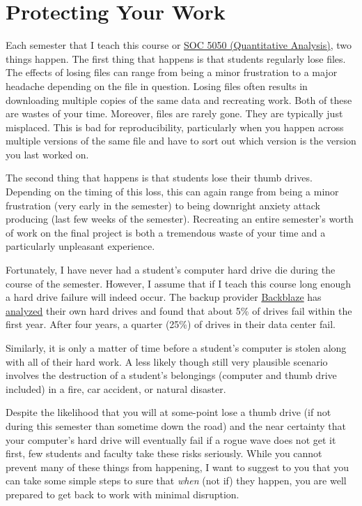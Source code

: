 \documentclass[]{book}
\begin{document}
\chapter{Protecting Your Work}\label{protecting-your-work}

Each semester that I teach this course or
\href{https://slu-soc5050.github.io}{SOC 5050 (Quantitative Analysis)},
two things happen. The first thing that happens is that students
regularly lose files. The effects of losing files can range from being a
minor frustration to a major headache depending on the file in question.
Losing files often results in downloading multiple copies of the same
data and recreating work. Both of these are wastes of your time.
Moreover, files are rarely gone. They are typically just misplaced. This
is bad for reproducibility, particularly when you happen across multiple
versions of the same file and have to sort out which version is the
version you last worked on.

The second thing that happens is that students lose their thumb drives.
Depending on the timing of this loss, this can again range from being a
minor frustration (very early in the semester) to being downright
anxiety attack producing (last few weeks of the semester). Recreating an
entire semester's worth of work on the final project is both a
tremendous waste of your time and a particularly unpleasant experience.

Fortunately, I have never had a student's computer hard drive die during
the course of the semester. However, I assume that if I teach this
course long enough a hard drive failure will indeed occur. The backup
provider \href{https://www.backblaze.com/}{Backblaze} has
\href{https://www.backblaze.com/blog/how-long-do-disk-drives-last/}{analyzed}
their own hard drives and found that about 5\% of drives fail within the
first year. After four years, a quarter (25\%) of drives in their data
center fail.

Similarly, it is only a matter of time before a student's computer is
stolen along with all of their hard work. A less likely though still
very plausible scenario involves the destruction of a student's
belongings (computer and thumb drive included) in a fire, car accident,
or natural disaster.

Despite the likelihood that you will at some-point lose a thumb drive
(if not during this semester than sometime down the road) and the near
certainty that your computer's hard drive will eventually fail if a
rogue wave does not get it first, few students and faculty take these
risks seriously. While you cannot prevent many of these things from
happening, I want to suggest to you that you can take some simple steps
to sure that \emph{when} (not if) they happen, you are well prepared to
get back to work with minimal disruption.
\end{document}
